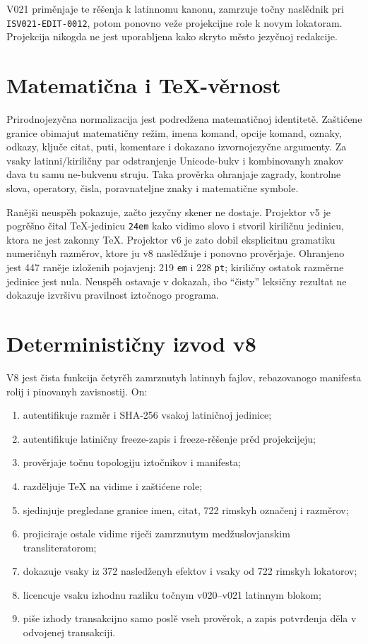 \documentclass[11pt]{article}
\newcommand{\code}[1]{\texttt{#1}}
\begin{document}
V021 priměnjaje te rěšenja k latinnomu kanonu, zamrzuje točny naslědnik pri \code{ISV021-EDIT-0012}, potom ponovno veže projekcijne role k novym lokatoram. Projekcija nikogda ne jest uporabljena kako skryto město jezyčnoj redakcije.

\section{Matematična i TeX-věrnost}

Prirodnojezyčna normalizacija jest podredžena matematičnoj identitetě. Zaštićene granice obimajut matematičny režim, imena komand, opcije komand, oznaky, odkazy, ključe citat, puti, komentare i dokazano izvornojezyčne argumenty. Za vsaky latinni/kiriličny par odstranjenje Unicode-bukv i kombinovanyh znakov dava tu samu ne-bukvenu struju. Taka prověrka ohranjaje zagrady, kontrolne slova, operatory, čisla, poravnateljne znaky i matematične symbole.

Ranějši neuspěh pokazuje, začto jezyčny skener ne dostaje. Projektor v5 je pogrěšno čital TeX-jedinicu \code{24em} kako vidimo slovo i stvoril kiriličnu jedinicu, ktora ne jest zakonny TeX. Projektor v6 je zato dobil eksplicitnu gramatiku numeričnyh razměrov, ktore ju v8 naslědžuje i ponovno prověrjaje. Ohranjeno jest 447 raněje izloženih pojavjenj: 219 \code{em} i 228 \code{pt}; kiriličny ostatok razměrne jedinice jest nula. Neuspěh ostavaje v dokazah, ibo ``čisty'' leksičny rezultat ne dokazuje izvršivu pravilnost iztočnogo programa.

\section{Determinističny izvod v8}

V8 jest čista funkcija četyrěh zamrznutyh latinnyh fajlov, rebazovanogo manifesta rolij i pinovanyh zavisnostij. On:

\begin{enumerate}
\item autentifikuje razměr i SHA-256 vsakoj latiničnoj jedinice;
\item autentifikuje latiničny freeze-zapis i freeze-rěšenje prěd projekcijeju;
\item prověrjaje točnu topologiju iztočnikov i manifesta;
\item razděljuje TeX na vidime i zaštićene role;
\item sjedinjuje pregledane granice imen, citat, 722 rimskyh označenj i razměrov;
\item projiciraje ostale vidime riječi zamrznutym medžuslovjanskim transliteratorom;
\item dokazuje vsaky iz 372 nasledženyh efektov i vsaky od 722 rimskyh lokatorov;
\item licencuje vsaku izhodnu razliku točnym v020--v021 latinnym blokom;
\item piše izhody transakcijno samo poslě vseh prověrok, a zapis potvrđenja děla v odvojenej transakciji.
\end{enumerate}
\end{document}
